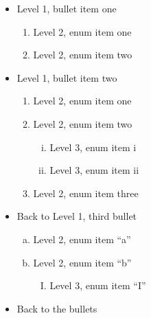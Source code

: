 \documentclass[DIV=12,%
               BCOR=0mm,%
               fontsize=10pt,%
               oneside,%
               paper=210mm:11in]{scrbook}
\begin{document}
\begin{itemize}
\item\relax 
Level 1, bullet item one


\begin{enumerate}[1.]
\item\relax 
Level 2, enum item one



\item\relax 
Level 2, enum item two




\end{enumerate}


\item\relax 
Level 1, bullet item two


\begin{enumerate}[1.]
\item\relax 
Level 2, enum item one



\item\relax 
Level 2, enum item two


\begin{enumerate}[i.]
\item\relax 
Level 3, enum item i



\item\relax 
Level 3, enum item ii




\end{enumerate}


\item\relax 
Level 2, enum item three




\end{enumerate}


\item\relax 
Back to Level 1, third bullet


\begin{enumerate}[a.]
\item\relax 
Level 2, enum item “a”



\item\relax 
Level 2, enum item “b”


\begin{enumerate}[I.]
\item\relax 
Level 3, enum item “I”




\end{enumerate}



\end{enumerate}


\item\relax 
Back to the bullets




\end{itemize}
\end{document}
